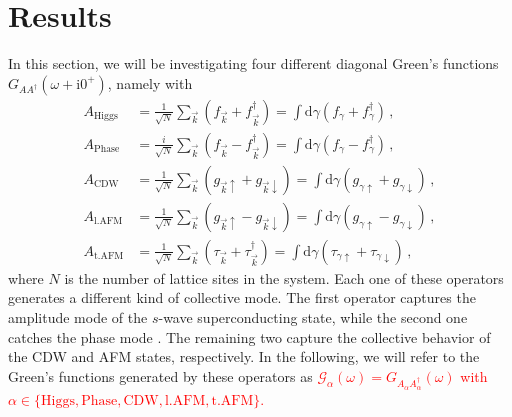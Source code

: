 \documentclass[
    reprint, 
    aps,
    preprintnumbers,
    twocolumn,
    prb,
    superscriptaddress
]{revtex4-2}
\newcommand{\vk}{\vec{k}}
\newcommand{\up}{\uparrow}
\newcommand{\down}{\downarrow}
\newcommand{\im}{\mathrm{i}}
\newcommand{\dgamma}{\mathrm{d}\gamma}
\begin{document}


\section{Results}\label{sec:results}

In this section, we will be investigating four different diagonal Green's functions $G_{AA^\dagger}(\omega + \im 0^+)$, namely with
\begin{subequations}
    \label{eqn:resolvent_bases}
    \begin{align}
        A_\text{Higgs} &= \frac{1}{\sqrt{N}} \sum_{\vk} \left( f_{\vk} + f_{\vk}^\dagger \right)  
            = \int \dgamma \left( f_{\gamma} + f_{\gamma}^\dagger \right) \,,\\
        A_\text{Phase} &= \frac{i}{\sqrt{N}} \sum_{\vk} \left( f_{\vk} - f_{\vk}^\dagger \right) = \int \dgamma \left( f_{\gamma} - f_{\gamma}^\dagger \right) \,,\\
        A_\text{CDW}   &= \frac{1}{\sqrt{N}} \sum_{\vk} \left( g_{\vk \up} + g_{\vk \down} \right) = \int \dgamma \left( g_{\gamma \up} + g_{\gamma \down} \right) \,,\\
        A_\text{l.AFM}   &= \frac{1}{\sqrt{N}} \sum_{\vk} \left( g_{\vk \up} - g_{\vk \down} \right) = \int \dgamma \left( g_{\gamma \up} - g_{\gamma \down} \right) \,, \\
        A_\text{t.AFM}   &= \frac{1}{\sqrt{N}} \sum_{\vk} \left( \tau_{\vk} + \tau_{\vk}^\dagger \right) = \int \dgamma \left( \tau_{\gamma \up} + \tau_{\gamma \down} \right) \,,
    \end{align}
\end{subequations}
where $N$ is the number of lattice sites in the system. 
Each one of these operators generates a different kind of collective mode.
The first operator captures the amplitude mode of the $s$-wave superconducting state, while the second one catches the phase mode \cite{Fan22}.
The remaining two capture the collective behavior of the CDW and AFM states, respectively.
In the following, we will refer to the Green's functions generated by these operators as \textcolor{red}{$\mathcal{G}_{\alpha}(\omega) = G_{A_\alpha A_\alpha^\dagger}(\omega)$ 
with $\alpha \in \{ \text{Higgs}, \text{Phase}, \text{CDW}, \text{l.AFM}, \text{t.AFM} \}$.}
\end{document}
